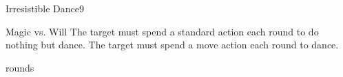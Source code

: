 \begin{spellsection}{Irresistible Dance}{9}
\begin{spellheader}
\end{spellheader}
\begin{spellcontent}
    \begin{spelltargetinginfo}
    \end{spelltargetinginfo}
    \begin{spelleffects}
        \begin{spellattack}{Magic vs. Will}
            \spellsuccess The target must spend a standard action each round to do nothing but dance.
            \spellfailure The target must spend a move action each round to dance.
        \end{spellattack}
         rounds
    \end{spelleffects}
\end{spellcontent}
\begin{spellfooter}
\end{spellfooter}

\begin{comment}
\subsubsection{J-L}
\end{comment}
\end{spellsection}

